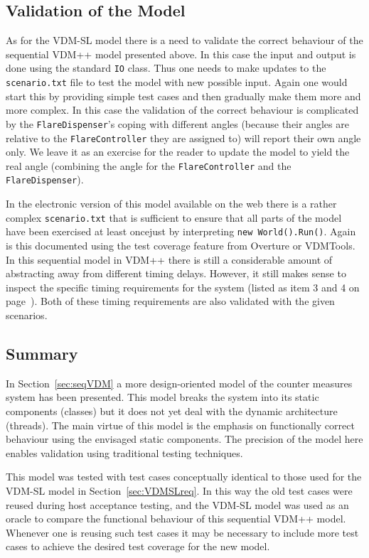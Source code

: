 \documentclass{overturerepchap}
\newcommand{\VDMTools}{VDMTools}
\begin{document}
\subsection{Validation of the Model}

As for the VDM-SL model there is a need to validate the correct behaviour
of the sequential VDM++ model presented above. In this case the input
and output is done using the standard \texttt{IO} class. Thus one needs
to make updates to the \texttt{scenario.txt} file to test the model with
new possible input. Again one would start this by providing simple test
cases and then gradually make them more and more complex. In this case
the validation of the correct behaviour is complicated by the 
\texttt{FlareDispenser}'s coping with different angles (because their 
angles are relative to the \texttt{FlareController} they are assigned to)
will report their own angle only. We leave it as an exercise for the
reader to update the model to yield the real angle (combining the angle
for the \texttt{FlareController} and the \texttt{FlareDispenser}).

In the electronic
version of this model available on the web there is a rather complex 
\texttt{scenario.txt} that is sufficient to ensure that all parts of the
model have been exercised at least oncejust by interpreting
\texttt{new World().Run()}. Again is this documented using the
test coverage feature from Overture or 
\VDMTools. In this sequential model in VDM++
there is still a considerable amount of
abstracting away from different timing delays. However, it still makes
sense to inspect the specific timing requirements for the system 
(listed as item 3 and 4 on page~\pageref{timereq34}). Both of these
timing requirements are also validated with the given scenarios.

\subsection{Summary}

In Section~\ref{sec:seqVDM} a more design-oriented model of the
counter measures system has been presented. This model breaks the
system into its static components (classes) but it does not yet deal
with the dynamic architecture (threads). The main virtue of this model
is the emphasis on functionally correct behaviour using the envisaged
static components.  The precision of the model here enables validation
using traditional testing techniques.

This model was tested with test cases conceptually identical to those
used for the VDM-SL model in Section~\ref{sec:VDMSLreq}.  In this way
the old test cases were reused during host acceptance testing, and the
VDM-SL model was used as an oracle to compare the functional behaviour
of this sequential VDM++ model. Whenever one is reusing such test
cases it may be necessary to include more test cases to achieve the
desired test coverage for the new model.
\end{document}
